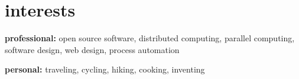 \section{interests}

\textbf{professional:} open source software, distributed computing,
parallel computing, software design, web design, process automation

\textbf{personal:} traveling, cycling, hiking, cooking, inventing
